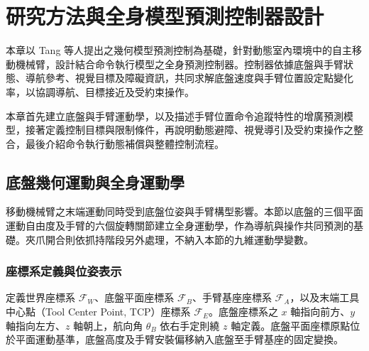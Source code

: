 
\chapter{研究方法與全身模型預測控制器設計}
\label{c:methodology}

本章以 Tang 等人\cite{tang2024gmpc}提出之幾何模型預測控制為基礎，針對動態室內環境中的自主移動機械臂，設計結合命令執行模型之全身預測控制器。控制器依據底盤與手臂狀態、導航參考、視覺目標及障礙資訊，共同求解底盤速度與手臂位置設定點變化率，以協調導航、目標接近及受約束操作。

本章首先建立底盤與手臂運動學，以及描述手臂位置命令追蹤特性的增廣預測模型，接著定義控制目標與限制條件，再說明動態避障、視覺導引及受約束操作之整合，最後介紹命令執行動態補償與整體控制流程。

\section{底盤幾何運動與全身運動學}
\label{sec:wholebody_kinematics}

移動機械臂之末端運動同時受到底盤位姿與手臂構型影響。本節以底盤的三個平面運動自由度及手臂的六個旋轉關節建立全身運動學，作為導航與操作共同預測的基礎。夾爪開合則依抓持階段另外處理，不納入本節的九維運動學變數。

\subsection{座標系定義與位姿表示}
\label{subsec:frames_pose_representation}

定義世界座標系 $\mathcal{F}_{W}$、底盤平面座標系 $\mathcal{F}_{B}$、手臂基座座標系 $\mathcal{F}_{A}$，以及末端工具中心點（Tool Center Point, TCP）座標系 $\mathcal{F}_{E}$。底盤座標系之 $x$ 軸指向前方、$y$ 軸指向左方、$z$ 軸朝上，航向角 $\theta_B$ 依右手定則繞 $z$ 軸定義。底盤平面座標原點位於平面運動基準，底盤高度及手臂安裝偏移納入底盤至手臂基座的固定變換。

